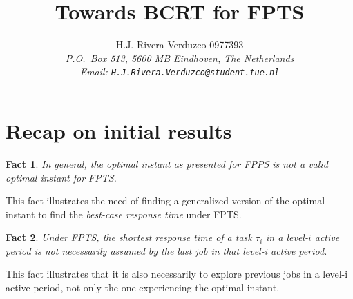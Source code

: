 \documentclass[fleqn]{article}
\title{\sf Towards BCRT for FPTS}
\author{{\sf H.J. Rivera Verduzco 0977393}\\
{\footnotesize\sl P.O.~Box 513, 5600 MB Eindhoven, The Netherlands}\\
{\footnotesize \sl Email: \tt H.J.Rivera.Verduzco@student.tue.nl}}
\newtheorem{fact}{Fact}
\begin{document}
\maketitle


\section{Recap on initial results}

\begin{fact}
	In general, the optimal instant as presented for FPPS is not a valid optimal instant for FPTS.
\end{fact}

This fact illustrates the need of finding a generalized version of the optimal instant to find the \textit{best-case response time} under FPTS.

\begin{fact}
	Under FPTS, the shortest response time of a task $\tau_i$ in a level-$i$ active period is not necessarily assumed by the last job in that level-i active period.
\end{fact}

This fact illustrates that it is also necessarily to explore previous jobs in a level-i active period, not only the one experiencing the optimal instant.
\end{document}
